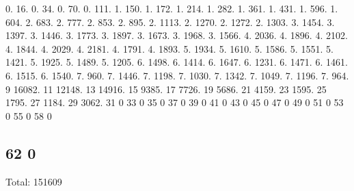 0. 16. 0. 34. 0. 70. 0. 111. 1. 150. 1. 172. 1. 214. 1. 282. 1. 361. 1. 431. 1. 596. 1. 604. 2. 683. 2. 777. 2. 853. 2. 895. 2. 1113. 2. 1270. 2. 1272. 2. 1303. 3. 1454. 3. 1397. 3. 1446. 3. 1773. 3. 1897. 3. 1673. 3. 1968. 3. 1566. 4. 2036. 4. 1896. 4. 2102. 4. 1844. 4. 2029. 4. 2181. 4. 1791. 4. 1893. 5. 1934. 5. 1610. 5. 1586. 5. 1551. 5. 1421. 5. 1925. 5. 1489. 5. 1205. 6. 1498. 6. 1414. 6. 1647. 6. 1231. 6. 1471. 6. 1461. 6. 1515. 6. 1540. 7. 960. 7. 1446. 7. 1198. 7. 1030. 7. 1342. 7. 1049. 7. 1196. 7. 964. 9 16082. 11 12148. 13 14916. 15 9385. 17 7726. 19 5686. 21 4159. 23 1595. 25 1795. 27 1184. 29 3062. 31 0 33 0 35 0 37 0 39 0 41 0 43 0 45 0 47 0 49 0 51 0 53 0 55 0 58 0 \subsection*{62 0 }

Total\+: 151609 